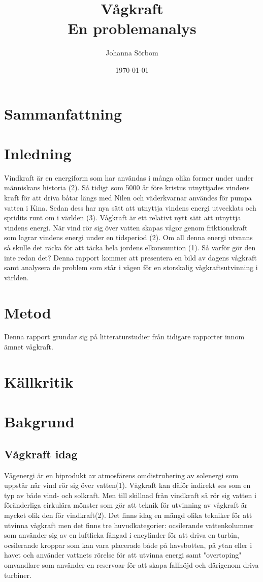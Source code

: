 \documentclass[10pt,a4paper,oneside]{article}
\title{Vågkraft \\ 
\large En problemanalys}
\author{\small Johanna Sörbom}
\date{\small \today}
\begin{document}
\maketitle
\newpage

\section{Sammanfattning}
\newpage

\tableofcontents
\newpage

\section{Inledning}
Vindkraft är en energiform som har användas i många olika former under under människans historia (2). Så tidigt som 5000 år före kristus utnyttjades vindens kraft för att driva båtar längs med Nilen och väderkvarnar användes för pumpa vatten i Kina. Sedan dess har nya sätt att utnyttja vindens energi utvecklats och spridits runt om i världen (3). Vågkraft är ett relativt nytt sätt att utnyttja vindens energi. När vind rör sig över vatten skapas vågor genom friktionskraft som lagrar vindens energi under en tidsperiod (2). Om all denna energi utvanns så skulle det räcka för att täcka hela jordens elkonsumtion (1). Så varför gör den inte redan det? Denna rapport kommer att presentera en bild av dagens vågkraft samt analysera de problem som står i vägen för en storskalig vågkraftsutvinning i världen. 
\newpage

\section{Metod}
Denna rapport grundar sig på litteraturstudier från tidigare rapporter innom ämnet vågkraft. 

\section{Källkritik}

\section{Bakgrund}
\subsection{Vågkraft idag}
Vågenergi är en biprodukt av atmosfärens omdistrubering av solenergi som uppstår när vind rör sig över vatten(1). Vågkraft kan däför indirekt ses som en typ av både vind- och solkraft. Men till skillnad från vindkraft så rör sig vatten i föränderliga cirkulära mönster som gör att teknik för utvinning av vågkraft är mycket olik den för vindkraft(2). Det finns idag en mängd olika tekniker för att utvinna vågkraft men det finns tre huvudkategorier:  ocsilerande vattenkolumner som använder sig av en luftficka fångad i encylinder för att driva en turbin, ocsilerande kroppar som kan vara placerade både på havsbotten, på ytan eller i havet och använder vattnets rörelse för att utvinna energi samt "overtoping" omvandlare som använder en reservoar för att skapa fallhöjd och därigenom driva turbiner. 
\end{document}
